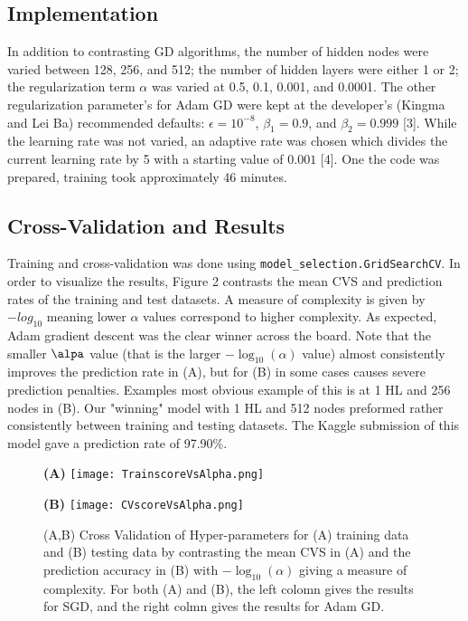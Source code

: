 \documentclass{article}
\begin{document}
\subsection{Implementation}
In addition to contrasting GD algorithms, the number of hidden nodes were varied between 128, 256, and 512; the number of hidden layers were either 1 or 2; the regularization term $\alpha$ was varied at 0.5, 0.1, 0.001, and 0.0001. The other regularization parameter's for Adam GD were kept at the developer's (Kingma and Lei Ba) recommended defaults: $\epsilon = 10^{-8}$, $\beta_1=0.9$, and $\beta_2=0.999$ [3]. While the learning rate was not varied, an adaptive rate was chosen which divides the current learning rate by 5 with a starting value of $0.001$ [4]. One the code was prepared, training took approximately 46 minutes.

\subsection{Cross-Validation and Results}
Training and cross-validation was done using \verb+model_selection.GridSearchCV+. In order to visualize the results, Figure 2 contrasts the mean CVS and prediction rates of the training and test datasets. A measure of complexity is given by $-log_{10}$ meaning lower $\alpha$ values correspond to higher complexity. As expected, Adam gradient descent was the clear winner across the board. Note that the smaller $\alpa$ value (that is the larger $-\log_{10}(\alpha)$ value) almost consistently improves the prediction rate in (A), but for (B) in some cases causes severe prediction penalties. Examples most obvious example of this is at 1 HL and 256 nodes in (B). Our "winning" model with 1 HL and 512 nodes preformed rather consistently between training and testing datasets. The Kaggle submission of this model gave a prediction rate of 97.90\%.

\begin{figure}[h]
    \centering
    \begin{minipage}[t]{0.45\textwidth}
        \centering
        \textbf{(A)}
        \texttt{[image: TrainscoreVsAlpha.png]}
    \end{minipage}
    \begin{minipage}[t]{0.45\textwidth}
        \centering
        \textbf{(B)}
        \texttt{[image: CVscoreVsAlpha.png]}
    \end{minipage}
\caption{(A,B) Cross Validation of Hyper-parameters for (A) training data and (B) testing data by contrasting the mean CVS in (A) and the prediction accuracy in (B) with $-\log_{10}(\alpha)$ giving a measure of complexity. For both (A) and (B), the left colomn gives the results for SGD, and the right colmn gives the results for Adam GD.}
\end{figure}
\end{document}
